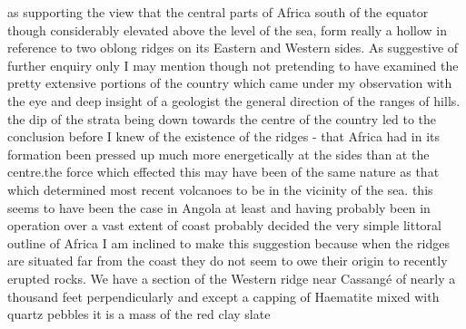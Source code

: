 \documentclass[11pt,twoside]{article}\makeatletter
\begin{document}
as supporting the view {\newline \newline \noindent [0010]}  \newline that the central parts of Africa south of the equator  \newline though considerably elevated above the level of  \newline the sea, form really a hollow in reference to  \newline two oblong ridges on its Eastern and Western  \newline sides. As suggestive of further enquiry  \newline only I may mention though not pretending  \newline to have examined the pretty extensive  \newline portions of the country which came under  \newline my observation with the eye and deep  \newline insight of a geologist the general direction  \newline of the ranges of hills. the dip of the strata  \newline being down towards the centre of the country  \newline led to the conclusion before I knew of the  \newline existence of the ridges - that Africa had  \newline in its formation been pressed up much  \newline more energetically at the sides than at the  \newline centre.the force which effected this may have  \newline been of the same nature as that which determined  \newline most recent volcanoes to be in the vicinity  \newline of the sea. this seems to have been the  \newline case in Angola at least and having  \newline probably been in operation over a vast  \newline extent of coast probably decided the  \newline very simple littoral outline of Africa {\newline \newline \noindent [0011]}  \newline I am inclined to make this suggestion because  \newline when the ridges are situated far from the coast  \newline they do not seem to owe their origin to  \newline recently erupted rocks. We have a section  \newline of the Western ridge near Cassangé of nearly  \newline a thousand feet perpendicularly and except  \newline a capping of Haematite mixed with quartz  \newline pebbles it is a mass of the red clay slate  \newline 
\end{document}
